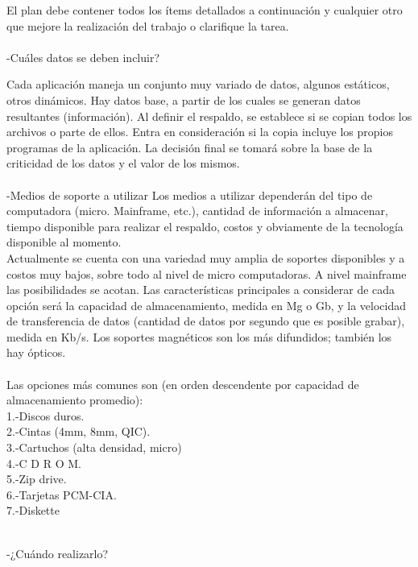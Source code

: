 \documentclass[12pt,letterpaper]{article}
\begin{document}
El plan debe contener todos los ítems detallados a continuación y cualquier otro que mejore la realización del trabajo o clarifique la tarea. \\\\


-Cuáles datos se deben incluir? 
 
Cada aplicación maneja un conjunto muy variado de datos, algunos estáticos, otros dinámicos. Hay datos base, a partir de los cuales se generan datos resultantes (información). Al definir el respaldo, se establece si se copian todos los archivos o parte de ellos. Entra en consideración si la copia incluye los propios programas de la aplicación. La decisión final se tomará sobre la base de la criticidad de los datos y el valor de los mismos.  \\\\


-Medios de soporte a utilizar 
 Los medios a utilizar dependerán del tipo de computadora (micro. Mainframe, etc.), cantidad de información a almacenar, tiempo disponible para realizar el respaldo, costos y obviamente de la tecnología disponible al momento. \\
 Actualmente se cuenta con una variedad muy amplia de soportes disponibles y a costos muy bajos, sobre todo al nivel de micro computadoras. A nivel mainframe las posibilidades se acotan. Las características principales a considerar de cada opción será la capacidad de almacenamiento, medida en Mg o Gb, y la velocidad de transferencia de datos (cantidad de datos por segundo que es posible grabar), medida en Kb/s. Los soportes magnéticos son los más difundidos; también los hay ópticos.  \\\\

Las opciones más comunes son (en orden descendente por capacidad de almacenamiento promedio): \\ 
1.-Discos duros.\\
2.-Cintas (4mm, 8mm, QIC).\\
3.-Cartuchos (alta densidad, micro)\\
4.-C D R O M.\\
5.-Zip drive.\\
6.-Tarjetas PCM-CIA.\\
7.-Diskette  \\\\

\newpage

-¿Cuándo realizarlo? 
\end{document}
